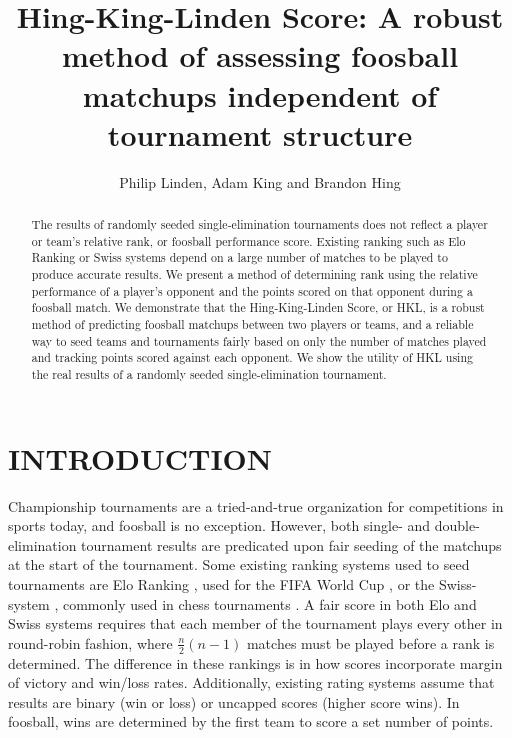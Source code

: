 \documentclass[letterpaper, 10 pt, conference]{ieeeconf}  %
\title{\LARGE \bf
Hing-King-Linden Score: 
A robust method of assessing foosball matchups independent of tournament 
structure
}
\author{Philip Linden, Adam King and Brandon Hing%
}
\begin{document}
\maketitle
\thispagestyle{empty}
\pagestyle{empty}


\begin{abstract}

The results of randomly seeded single-elimination tournaments does not reflect a
player or team's relative rank, or foosball performance score. Existing ranking
such as Elo Ranking or Swiss systems depend on a large number of matches to be
played to produce accurate results. We present a method of determining rank
using the relative performance of a player's opponent and the points scored on
that opponent during a foosball match. We demonstrate that the Hing-King-Linden
Score, or HKL, is a robust method of predicting foosball matchups between two
players or teams, and a reliable way to seed teams and tournaments fairly based
on only the number of matches played and tracking points scored against each
opponent. We show the utility of HKL using the real results of a randomly seeded
single-elimination tournament.

\end{abstract}


\section{INTRODUCTION}

Championship tournaments are a tried-and-true organization for competitions in
sports today, and foosball is no exception. However, both single- and
double-elimination tournament results are predicated upon fair seeding of the
matchups at the start of the tournament. Some existing ranking systems used to
seed tournaments are Elo Ranking \cite{elo}, used for the FIFA World Cup
\cite{fifa}, or the Swiss-system \cite{swiss}, commonly used in chess
tournaments \cite{chess}. A fair score in both Elo and Swiss systems requires
that each member of the tournament plays every other in round-robin fashion,
where $\frac{n}{2}(n-1)$ matches must be played before a rank is determined. The
difference in these rankings is in how scores incorporate margin of victory and
win/loss rates. Additionally, existing rating systems assume that results are
binary (win or loss) or uncapped scores (higher score wins). In foosball, wins
are determined by the first team to score a set number of points. 
\end{document}
